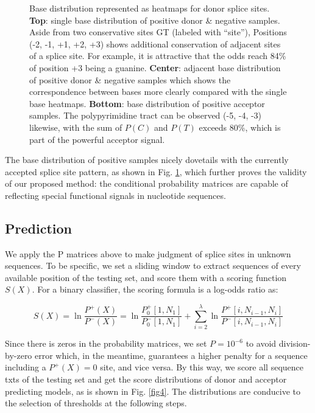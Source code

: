 \documentclass[journal,twoside]{IEEEtran}
\begin{document}
\begin{figure}[htbp]
\caption{Base distribution represented as heatmaps for donor splice sites. \textbf{Top}: single base distribution of positive donor \& negative samples. Aside from two conservative sites GT (labeled with ``site''), Positions (-2, -1, +1, +2, +3) shows additional conservation of adjacent sites of a splice site. For example, it is attractive that the odds reach 84\% of position +3 being a guanine. \textbf{Center}: adjacent base distribution of positive donor \& negative samples which shows the correspondence between bases more clearly compared with the single base heatmaps. \textbf{Bottom}: base distribution of positive acceptor samples. The polypyrimidine tract can be observed (-5, -4, -3) likewise, with the sum of $P(C)$ and $P(T)$ exceeds 80\%, which is part of the powerful acceptor signal. }
\label{fig3}
\end{figure}

The base distribution of positive samples nicely dovetails with the currently accepted splice site pattern, as shown in Fig. \ref{fig3}, which further proves the validity of our proposed method: the conditional probability matrices are capable of reflecting special functional signals in nucleotide sequences. 

\subsection{Prediction}\label{2.4}

We apply the P matrices above to make judgment of splice sites in unknown sequences. To be specific, we set a sliding window to extract sequences of every available position of the testing set, and score them with a scoring function $S(X)$. For a binary classifier, the scoring formula is a log-odds ratio as: 
\begin{small}
\begin{equation}
S(X) = \ln \displaystyle\frac{P^+(X)}{P^-(X)} 
= \ln \displaystyle\frac{P_0^+[1, N_1]}{P_0^-[1, N_1]} + \sum\limits_{i=2}^\lambda\ln \displaystyle\frac{P^+[i, N_{i-1}, N_i]}{P^-[i, N_{i-1}, N_i]}
\label{eq5}
\end{equation}
\end{small}

Since there is zeros in the probability matrices, we set  $P = 10^{-6}$  to avoid division-by-zero error which, in the meantime, guarantees a higher penalty for a sequence including a $P^+(X) = 0$ site, and vice versa. By this way, we score all sequence txts of the testing set and get the score distributions of donor and acceptor predicting models, as is shown in Fig. \ref{fig4}. The distributions are conducive to the selection of thresholds at the following steps. 
\end{document}
